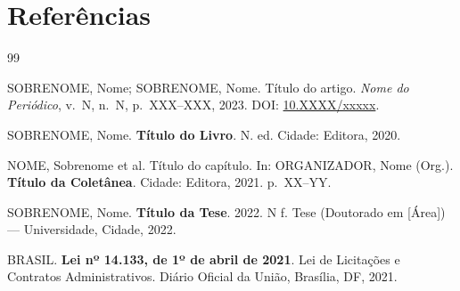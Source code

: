 \documentclass[
  12pt,
  a4paper,
  oneside,
  english,      %
  brazil
]{article}
\begin{document}
\section*{Referências}

%
%

% 

\begin{thebibliography}{99}

SOBRENOME, Nome; SOBRENOME, Nome. Título do artigo.
\textit{Nome do Periódico}, v.~N, n.~N, p.~XXX--XXX, 2023.
DOI: \href{https://doi.org/10.XXXX/xxxxx}{10.XXXX/xxxxx}.

SOBRENOME, Nome. \textbf{Título do Livro}. N. ed. Cidade: Editora, 2020.

NOME, Sobrenome et al. Título do capítulo. In:
ORGANIZADOR, Nome (Org.). \textbf{Título da Coletânea}.
Cidade: Editora, 2021. p.~XX--YY.

SOBRENOME, Nome. \textbf{Título da Tese}. 2022. N f.
Tese (Doutorado em [Área]) — Universidade, Cidade, 2022.

BRASIL. \textbf{Lei nº 14.133, de 1º de abril de 2021}.
Lei de Licitações e Contratos Administrativos. Diário Oficial da
União, Brasília, DF, 2021.


\end{thebibliography}

\newpage
\appendix
\end{document}
